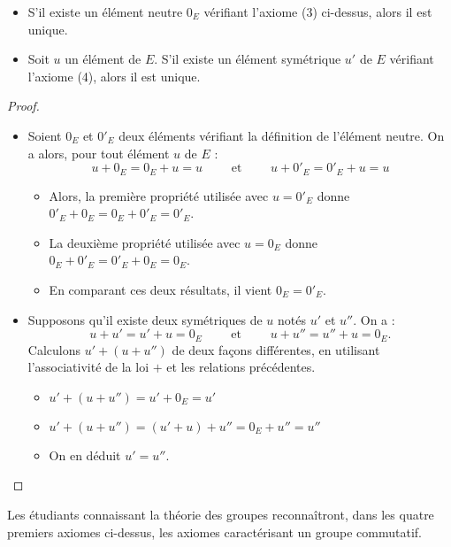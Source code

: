 \documentclass[class=report,crop=false]{standalone}
\begin{document}
\begin{proposition}
\sauteligne
\begin{itemize}
  \item S'il existe un élément neutre $0_{E}$ vérifiant l'axiome (3) ci-dessus, alors il est unique.
  \item Soit $u$ un élément de $E$. S'il existe un élément symétrique $u'$ de $E$ vérifiant l'axiome
(4), alors il est unique.
\end{itemize}
\end{proposition}


\begin{proof}
~
\begin{itemize}
  \item Soient $0_{E}$ et $0'_{E}$ deux éléments vérifiant
  la définition de l'élément neutre. On a alors, pour tout élément $u$ de $E$ :
$$u + 0_{E}=0_{E}+u=u \qquad \text{ et } \qquad u + 0'_{E}=0'_{E}+u=u$$
  \begin{itemize}
    \item Alors, la première propriété utilisée avec $u=0'_{E}$ donne
$0'_{E}+0_{E}=0_{E}+0'_{E}=0'_{E}$.
    \item La deuxième propriété utilisée avec $u=0_{E}$ donne
$0_{E}+0'_{E}=0'_{E}+0_{E}=0_{E}$.
    \item En comparant ces deux résultats, il vient $0_{E}=0'_{E}$.
  \end{itemize}

  \item Supposons qu'il existe deux symétriques de $u$ notés $u'$ et $u''$. On a :
$$u+u'=u'+u=0_{E}  \qquad \text{ et } \qquad u+u''=u''+u=0_{E}.$$
Calculons $u'+(u+u'')$ de deux façons différentes, en utilisant
l'associativité de la loi $+$ et les relations précédentes.
  \begin{itemize}
    \item $u'+(u+u'')= u'+ 0_{E}= u'$
    \item $u'+(u+u'')=(u'+u)+u''=0_{E}+u''=u''$
    \item On en déduit $u'=u''$.
  \end{itemize}
\end{itemize}
\end{proof}


\begin{remarque*}
Les étudiants connaissant la théorie des groupes reconnaîtront, dans
les quatre premiers axiomes ci-dessus, les axiomes caractérisant
un groupe commutatif.
\end{remarque*}
\end{document}
